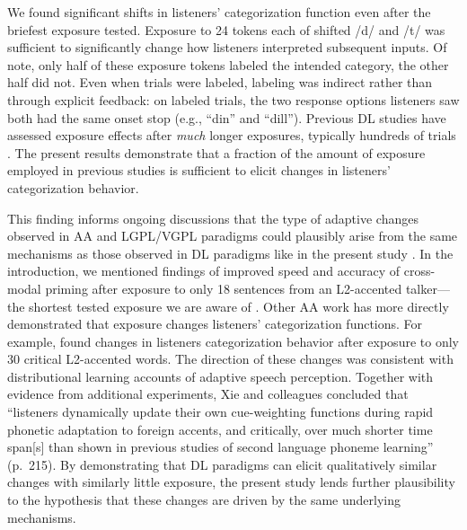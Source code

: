 \documentclass[
  11pt,
  man,mask,floatsintext]{apa6}
\begin{document}
We found significant shifts in listeners' categorization function even after the briefest exposure tested. Exposure to 24 tokens each of shifted /d/ and /t/ was sufficient to significantly change how listeners interpreted subsequent inputs. Of note, only half of these exposure tokens labeled the intended category, the other half did not. Even when trials were labeled, labeling was indirect rather than through explicit feedback: on labeled trials, the two response options listeners saw both had the same onset stop (e.g., ``din'' and ``dill''). Previous DL studies have assessed exposure effects after \emph{much} longer exposures, typically hundreds of trials \autocites[e.g., 192 trials in][]{harmon2019}[200 in][]{idemaru-holt2011}[222 in][]{clayards2008,kleinschmidt-jaeger2016}[236 in][]{theodore-monto2019}[456 in][]{nixon2016}. The present results demonstrate that a fraction of the amount of exposure employed in previous studies is sufficient to elicit changes in listeners' categorization behavior.

This finding informs ongoing discussions that the type of adaptive changes observed in AA and LGPL/VGPL paradigms could plausibly arise from the same mechanisms as those observed in DL paradigms like in the present study \autocite{bradlow-bent2008,baese-berk2018,zheng-samuel2020,xie2023}. In the introduction, we mentioned findings of improved speed and accuracy of cross-modal priming after exposure to only 18 sentences from an L2-accented talker---the shortest tested exposure we are aware of \autocite{clarke-garrett2004,xie2018}. Other AA work has more directly demonstrated that exposure changes listeners' categorization functions. For example, \textcite{xie2017} found changes in listeners categorization behavior after exposure to only 30 critical L2-accented words. The direction of these changes was consistent with distributional learning accounts of adaptive speech perception. Together with evidence from additional experiments, Xie and colleagues concluded that ``listeners dynamically update their own cue-weighting functions during rapid phonetic adaptation to foreign accents, and critically, over much shorter time span{[}s{]} than shown in previous studies of second language phoneme learning'' (p.~215). By demonstrating that DL paradigms can elicit qualitatively similar changes with similarly little exposure, the present study lends further plausibility to the hypothesis that these changes are driven by the same underlying mechanisms.
\end{document}
